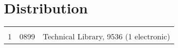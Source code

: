 \ifsand
{}
\pagestyle{fancy}
\newpage
{}
\section*{Distribution}
\begin{tabular}[t]{lll}
  & & \\

1 & 0899 & Technical Library, 9536 (1 electronic)
\end{tabular}
\fi

\fancyhead{}
\cleardoublepage
